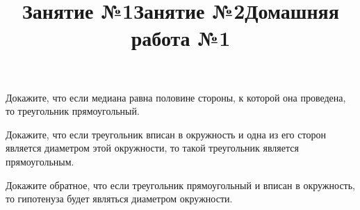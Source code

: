 \title{Занятие №1}
\begin{listofex}
	\item {}
	\item {}
	\item {}
	\item {}
	\item {}
	\item {}
	\item {}
	\item {}
	\item {}
	\item {}
\end{listofex}
\newpage
\title{Занятие №2}
\begin{listofex}
	\item {}
	\item Докажите, что если медиана равна половине стороны, к которой она проведена, то треугольник прямоугольный.
	\item {}
	\item Докажите, что если треугольник вписан в окружность и одна из его сторон является диаметром этой окружности, то такой треугольник является прямоугольным.
	\item Докажите обратное, что если треугольник прямоугольный и вписан в окружность, то гипотенуза будет являться диаметром окружности.
	\item {}
	\item {}
	\item {}
\end{listofex}
\newpage
\title{Домашняя работа №1}
\begin{listofex}
	\item {}
	\item {}
	\item {}
	\item {}
	\item {}
	\item {}

\end{listofex}
